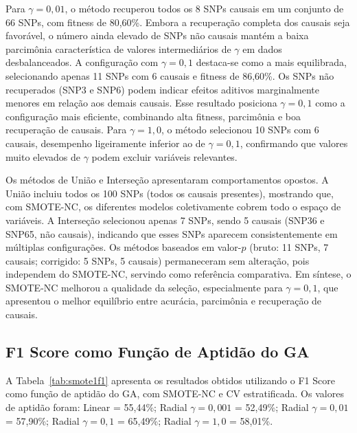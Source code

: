 \documentclass[
    12pt,
    a4paper,
    oneside,
    english,
    french,
    spanish,
    brazil
    ]{abntex2}
\newcommand{\novo}[1]{\textcolor{corNova}{#1}}
\begin{document}
\novo{Para $\gamma = 0{,}01$, o método recuperou todos os 8 SNPs causais em um conjunto de 66 SNPs, com fitness de 80,60\%. Embora a recuperação completa dos causais seja favorável, o número ainda elevado de SNPs não causais mantém a baixa parcimônia característica de valores intermediários de $\gamma$ em dados desbalanceados. A configuração com $\gamma = 0{,}1$ destaca-se como a mais equilibrada, selecionando apenas 11 SNPs com 6 causais e fitness de 86,60\%. Os SNPs não recuperados (SNP3 e SNP6) podem indicar efeitos aditivos marginalmente menores em relação aos demais causais. Esse resultado posiciona $\gamma = 0{,}1$ como a configuração mais eficiente, combinando alta fitness, parcimônia e boa recuperação de causais. Para $\gamma = 1{,}0$, o método selecionou 10 SNPs com 6 causais, desempenho ligeiramente inferior ao de $\gamma = 0{,}1$, confirmando que valores muito elevados de $\gamma$ podem excluir variáveis relevantes.}

\novo{Os métodos de União e Interseção apresentaram comportamentos opostos. A União incluiu todos os 100 SNPs (todos os causais presentes), mostrando que, com SMOTE-NC, os diferentes modelos coletivamente cobrem todo o espaço de variáveis. A Interseção selecionou apenas 7 SNPs, sendo 5 causais (SNP36 e SNP65, não causais), indicando que esses SNPs aparecem consistentemente em múltiplas configurações. Os métodos baseados em valor-$p$ (bruto: 11 SNPs, 7 causais; corrigido: 5 SNPs, 5 causais) permaneceram sem alteração, pois independem do SMOTE-NC, servindo como referência comparativa. Em síntese, o SMOTE-NC melhorou a qualidade da seleção, especialmente para $\gamma = 0{,}1$, que apresentou o melhor equilíbrio entre acurácia, parcimônia e recuperação de causais.}

\subsection{F1 Score como Função de Aptidão do GA}

\novo{A Tabela~\ref{tab:smote1f1} apresenta os resultados obtidos utilizando o F1 Score como função de aptidão do GA, com SMOTE-NC e CV estratificada. Os valores de aptidão foram: Linear = 55,44\%; Radial $\gamma{=}0{,}001$ = 52,49\%; Radial $\gamma{=}0{,}01$ = 57,90\%; Radial $\gamma{=}0{,}1$ = 65,49\%; Radial $\gamma{=}1{,}0$ = 58,01\%.}
\end{document}
